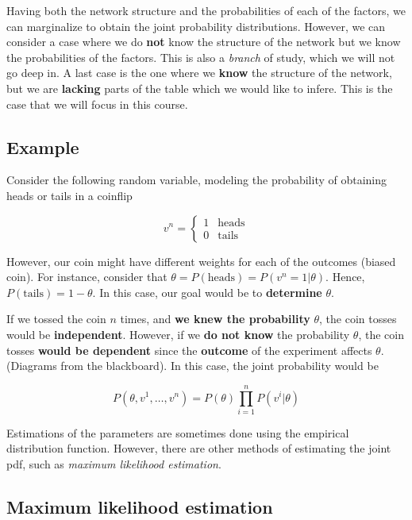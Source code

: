Having both the network structure and the probabilities of each of the
factors, we can marginalize to obtain the joint probability
distributions. However, we can consider a case where we do \textbf{not}
know the structure of the network but we know the probabilities of the
factors. This is also a \emph{branch} of study, which we will not go
deep in. A last case is the one where we \textbf{know} the structure of
the network, but we are \textbf{lacking} parts of the table which we
would like to infere. This is the case that we will focus in this
course.

\hypertarget{example}{%
\subsection{Example}\label{example}}

Consider the following random variable, modeling the probability of
obtaining heads or tails in a coinflip

\[
v^n =\begin{cases}
1 & \text{heads}\\
0 & \text{tails}
\end{cases}
\]

However, our coin might have different weights for each of the outcomes
(biased coin). For instance, consider that
\(\theta = P(\text{heads}) = P(v^n = 1| \theta)\). Hence,
\(P(\text{tails}) = 1-\theta\). In this case, our goal would be to
\textbf{determine} \(\theta\).

If we tossed the coin \(n\) times, and \textbf{we knew the probability}
\(\theta\), the coin tosses would be \textbf{independent}. However, if
we \textbf{do not know} the probability \(\theta\), the coin tosses
\textbf{would be dependent} since the \textbf{outcome} of the experiment
affects \(\theta\). (Diagrams from the blackboard). In this case, the
joint probability would be

\[
P(\theta,v^1,\dots,v^n) = P(\theta)\prod_{i=1}^n P(v^i|\theta)
\]

Estimations of the parameters are sometimes done using the empirical
distribution function. However, there are other methods of estimating
the joint pdf, such as \emph{maximum likelihood estimation}.

\hypertarget{maximum-likelihood-estimation}{%
\subsection{Maximum likelihood
estimation}\label{maximum-likelihood-estimation}}

